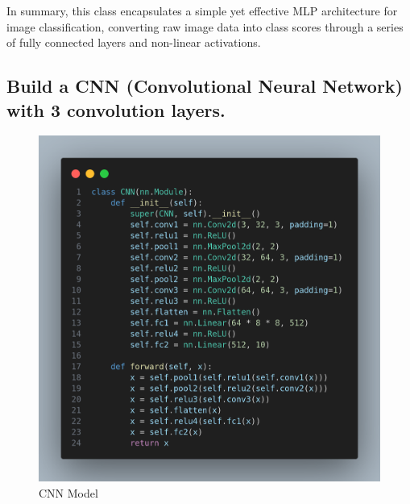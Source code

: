 \documentclass[a4paper,12pt]{article}
\begin{document}
\begin{itemize}
    In summary, this class encapsulates a simple yet effective MLP architecture for image classification, converting raw image data into class scores through a series of fully connected layers and non-linear activations.
\end{itemize}
\newpage

\subsection{Build a CNN (Convolutional Neural Network) with 3 convolution layers.}

\begin{figure}[h]
    \centering
    \includegraphics[width=0.6\linewidth]{images/CNN_model.png}
    \caption{CNN Model}
    \label{fig:enter-label}
\end{figure}
\end{document}
